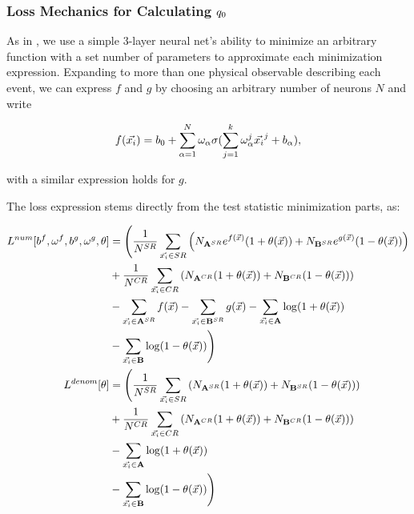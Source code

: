 \documentclass[../../ddppaper2.tex]{subfiles}
\begin{document}
\subsubsection{Loss Mechanics for Calculating \texorpdfstring{${q_{0}}$}{the Test Statistic}}

As in \cite{LastDDPPaper}, we use a simple 3-layer neural net's ability to minimize an arbitrary function with a set number of parameters to approximate each minimization expression. Expanding to more than one physical observable describing each event, we can express $f$ and $g$ by choosing an arbitrary number of neurons $N$ and write

\begin{equation}
\label{eq:neural_net_explicit}
    f(\event) = b_{0} + \sum\limits_{\alpha = 1}^{N} \omega_{\alpha} \sigma(\sum\limits_{j = 1}^{k}\omega^j_{\alpha} \event^j + b_\alpha),
\end{equation}

\noindent with a similar expression holds for $g$.

The loss expression stems directly from the test statistic minimization parts, as:

\begin{equation}
\label{eq:discrete_loss_functions}
\begin{aligned}
L^{num}[b^f, \omega^f, b^g, \omega^g, \nparam] &= \Bigg(
    \dfrac{1}{N^{SR}} \sum\limits_{\event \in SR} \left(
        {N_\srdataset{A}} e^{f(\anyevent)} (1 + {\nparam(\anyevent)})
        + {N_\srdataset{B}} e^{g(\anyevent)} (1 - {\nparam(\anyevent)})
    \right) \\&
    + \dfrac{1}{N^{CR}} \sum\limits_{\event \in CR} \left(
        {N_\crdataset{A}} (1 + {\nparam(\anyevent)})
        + {N_\crdataset{B}} (1 - {\nparam(\anyevent)})
    \right)
    \\&
    - \sum\limits_{\event \in \srdataset{A}} f(\anyevent)
    - \sum\limits_{\event \in \srdataset{B}} g(\anyevent)
    - \sum\limits_{\event \in \dataset{A}} \log(1 + {\nparam(\anyevent)})
    \\&- \sum\limits_{\event \in \dataset{B}} \log(1 - {\nparam(\anyevent)})
\Bigg)
\\
L^{denom}[\nparam] &= \Bigg(
    \dfrac{1}{N^{SR}} \sum\limits_{\event \in SR} \left(
        {N_\srdataset{A}} (1 + {\nparam(\anyevent)})
        + {N_\srdataset{B}} (1 - {\nparam(\anyevent)})
    \right) \\&
    + \dfrac{1}{N^{CR}} \sum\limits_{\event \in CR} \left(
        {N_\crdataset{A}} (1 + {\nparam(\anyevent)})
        + {N_\crdataset{B}} (1 - {\nparam(\anyevent)})
    \right)
    \\&
    - \sum\limits_{\event \in \dataset{A}} \log(1 + {\nparam(\anyevent)})
    \\&- \sum\limits_{\event \in \dataset{B}} \log(1 - {\nparam(\anyevent)})
\Bigg)
\end{aligned}
\end{equation}
\end{document}
